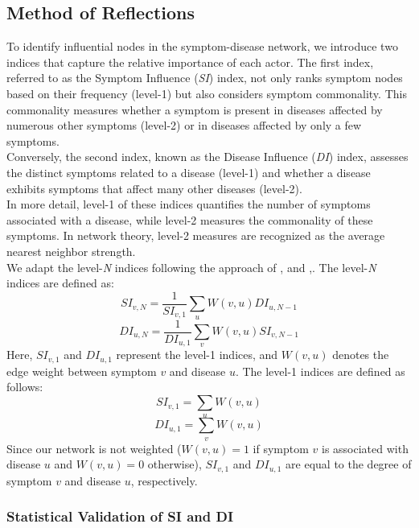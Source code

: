\subsection{Method of Reflections}

To identify influential nodes in the symptom-disease network, we introduce two indices that capture the relative importance of each actor.
The first index, referred to as the Symptom Influence (\textit{SI}) index, not only ranks symptom nodes based on their frequency (level-1)
but also considers symptom commonality.
This commonality measures whether a symptom is present in diseases affected by numerous other symptoms (level-2) or in diseases affected by only a few symptoms.\\
Conversely, the second index, known as the Disease Influence (\textit{DI}) index,
assesses the distinct symptoms related to a disease (level-1) and whether a disease exhibits symptoms that affect many other diseases (level-2).\\
In more detail, level-1 of these indices quantifies the number of symptoms associated with a disease,
while level-2 measures the commonality of these symptoms. In network theory, level-2 measures are recognized as the average nearest neighbor strength.\\
We adapt the level-\textit{N} indices following the approach of \citeauthor{Hidalgo_2007},\cite{Hidalgo_2007} and  \citeauthor{Hidalgo_2009},\cite{Hidalgo_2009}.
The level-\textit{N} indices are defined as:
\begin{equation}
    SI_{v, N} = \frac{1}{SI_{v, 1}} \sum_u W(v, u) DI_{u, N-1}
\end{equation}
\begin{equation}
    DI_{u, N} = \frac{1}{DI_{u, 1}} \sum_v W(v, u) SI_{v, N-1}
\end{equation}
\noindent
Here, $SI_{v, 1}$ and $DI_{u, 1}$ represent the level-1 indices, and $W(v,u)$ denotes the edge weight between symptom $v$ and disease $u$.
The level-1 indices are defined as follows:
\begin{equation}
    SI_{v, 1} = \sum_u W(v, u)
\end{equation}
\begin{equation}
    DI_{u, 1} = \sum_v W(v, u)
\end{equation}
\noindent
Since our network is not weighted ($W(v,u)=1$ if symptom $v$ is associated with disease $u$ and $W(v,u)=0$ otherwise),
$SI_{v,1}$ and $DI_{u,1}$ are equal to the degree of symptom $v$ and disease $u$, respectively.
\subsubsection*{Statistical Validation of SI and DI}

